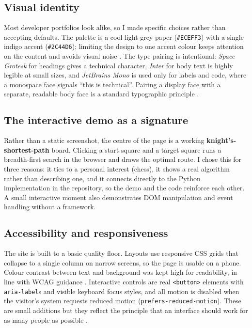 \documentclass[11pt,a4paper]{article}
\begin{document}
\subsection{Visual identity}
Most developer portfolios look alike, so I made specific choices rather than accepting
defaults. The palette is a cool light-grey paper (\texttt{\#ECEFF3}) with a single
indigo accent (\texttt{\#2C44D6}); limiting the design to one accent colour keeps
attention on the content and avoids visual noise \citep{lidwell2010}. The type pairing
is intentional: \emph{Space Grotesk} for headings gives a technical character,
\emph{Inter} for body text is highly legible at small sizes, and \emph{JetBrains Mono}
is used only for labels and code, where a monospace face signals ``this is technical''.
Pairing a display face with a separate, readable body face is a standard typographic
principle \citep{butterick2019}.

\subsection{The interactive demo as a signature}
Rather than a static screenshot, the centre of the page is a working
\textbf{knight's-shortest-path} board. Clicking a start square and a target square runs
a breadth-first search in the browser and draws the optimal route. I chose this for
three reasons: it ties to a personal interest (chess), it shows a real algorithm rather
than describing one, and it connects directly to the Python implementation in the
repository, so the demo and the code reinforce each other. A small interactive moment
also demonstrates DOM manipulation and event handling without a framework.

\subsection{Accessibility and responsiveness}
The site is built to a basic quality floor. Layouts use responsive CSS grids that
collapse to a single column on narrow screens, so the page is usable on a phone. Colour
contrast between text and background was kept high for readability, in line with WCAG
guidance \citep{wcag2018}. Interactive controls are real \texttt{<button>} elements with
\texttt{aria-label}s and visible keyboard focus styles, and all motion is disabled when
the visitor's system requests reduced motion (\texttt{prefers-reduced-motion}). These
are small additions but they reflect the principle that an interface should work for as
many people as possible \citep{wcag2018}.
\end{document}
